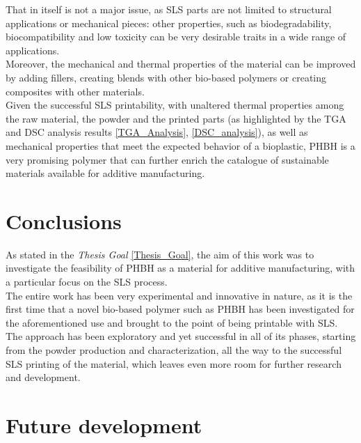 \documentclass{article}
\begin{document}
    That in itself is not a major issue, as SLS parts are not limited to structural applications or mechanical pieces:
    other properties, such as biodegradability, biocompatibility and low toxicity can be very desirable traits in a wide range of 
    applications. \\ 

    Moreover, the mechanical and thermal properties of the material can be improved by adding fillers, creating blends with other 
    bio-based polymers or creating composites with other materials. \\ 

    Given the successful SLS printability, with unaltered thermal properties among the raw material, the powder and the 
    printed parts (as highlighted by the TGA and DSC analysis results \ref{TGA_Analysis}, \ref{DSC_analysis}), as well as 
    mechanical properties that meet the expected behavior of a bioplastic, PHBH is a very promising polymer 
    that can further enrich the catalogue of sustainable materials available for additive manufacturing. \\ 

    \section{Conclusions\label{conclusions}}

    As stated in the \textit{Thesis Goal} \ref{Thesis_Goal}, the aim of this work was to investigate the feasibility of PHBH as a 
    material for additive manufacturing, with a particular focus on the SLS process. \\ 

    The entire work has been very experimental and innovative in nature, as it is the first time that a novel bio-based polymer such as PHBH has been investigated 
    for the aforementioned use and brought to the point of being printable with SLS. \\
    
    The approach has been exploratory and yet successful in all of its phases, starting from the powder production and characterization, all the way to the successful 
    SLS printing of the material, which leaves even more room for further research and development. 
    

    \clearpage
    \section{Future development\label{Future_development_and_research}}
\end{document}
